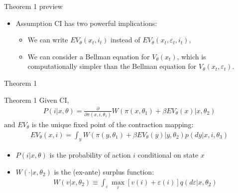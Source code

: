 \documentclass[xcolor=pdftex,dvipsnames,table,mathserif,aspectratio=169]{beamer}
\begin{document}
\begin{frame}{Theorem 1 preview}
\begin{itemize}
	\item Assumption CI has two powerful implications:
	\begin{itemize}
		\medskip
		\item We can write $ EV_{\theta}\left(x_{t},i_{t}\right)$ instead of $EV_{\theta}\left(x_{t},\varepsilon_{t},i_{t}\right)$,
		\medskip
		\item We can consider a Bellman equation for $ V_{\theta}\left(x_{t}\right)$, which is computationally simpler than
		the Bellman equation for $V_{\theta}\left(x_{t},\varepsilon_{t}\right) $.
	\end{itemize}
\end{itemize}
\end{frame}

\begin{frame}{Theorem 1}
\footnotesize
\begin{block}{Theorem 1}
Given CI,
\begin{align*}
	P\left(i|x,\theta\right) = \frac{\partial}{\partial \pi \left(x,i,\theta_{1}\right)} W\left( \pi \left(x,\theta_{1}\right) +\beta EV_{\theta}\left(x\right) |x,\theta_{2}\right)
\end{align*}
and  $EV_{\theta}$ is the unique fixed point of the contraction mapping:
\begin{align*} 
	EV_{\theta}\left(x,i\right) = \int_{y} W\left(\pi \left(y,\theta_{1}\right)+
	\beta EV_{\theta}\left(y\right)|y,\theta_{2}\right)
	p\left(dy|x,i,\theta_{3}\right)
\end{align*}
\begin{itemize}
	\item $P\left(i|x,\theta\right)$ is the probability of action $i$ conditional on state $x$
	\item $W\left( \cdot |x,\theta_{2}\right)$ is the (ex-ante) surplus function: 
	\begin{align*}
	W\left(v |x,\theta_{2}\right) \equiv \int_{\varepsilon}  \max_{i} \left[v\left( i \right) +\varepsilon\left( i \right)\right] 
	q\left(d\varepsilon|x,\theta_{2}\right)	
	\end{align*}
\end{itemize}
\end{block}
\end{frame}
\end{document}
